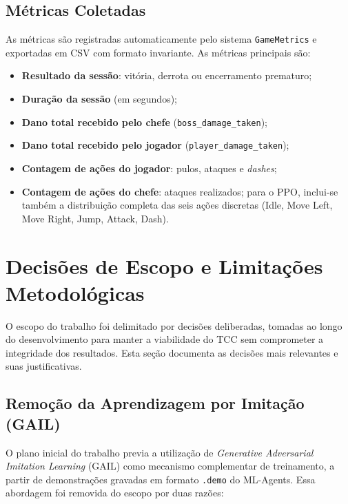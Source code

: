 \subsection{Métricas Coletadas}
\label{subsec:metricas}

As métricas são registradas automaticamente pelo sistema
\texttt{GameMetrics} e exportadas em CSV com formato invariante. As métricas
principais são:

\begin{itemize}
    \item \textbf{Resultado da sessão}: vitória, derrota ou encerramento
          prematuro;
    \item \textbf{Duração da sessão} (em segundos);
    \item \textbf{Dano total recebido pelo chefe}
          (\texttt{boss\_damage\_taken});
    \item \textbf{Dano total recebido pelo jogador}
          (\texttt{player\_damage\_taken});
    \item \textbf{Contagem de ações do jogador}: pulos, ataques e
          \textit{dashes};
    \item \textbf{Contagem de ações do chefe}: ataques realizados; para o
          PPO, inclui-se também a distribuição completa das seis ações
          discretas (Idle, Move Left, Move Right, Jump, Attack, Dash).
\end{itemize}

\section{Decisões de Escopo e Limitações Metodológicas}
\label{sec:decisoes-escopo}

O escopo do trabalho foi delimitado por decisões deliberadas, tomadas ao
longo do desenvolvimento para manter a viabilidade do TCC sem comprometer a
integridade dos resultados. Esta seção documenta as decisões mais relevantes
e suas justificativas.

\subsection{Remoção da Aprendizagem por Imitação (GAIL)}
\label{subsec:remocao-gail}

O plano inicial do trabalho previa a utilização de \textit{Generative
Adversarial Imitation Learning} (GAIL) \cite{ho2016gail} como mecanismo
complementar de treinamento, a partir de demonstrações gravadas em formato
\texttt{.demo} do ML-Agents. Essa abordagem foi removida do escopo por duas
razões:


